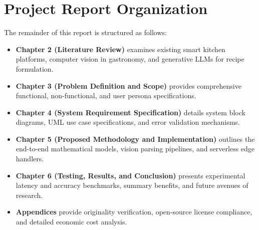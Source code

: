 \section{Project Report Organization}
The remainder of this report is structured as follows:
\begin{itemize}
    \item \textbf{Chapter 2 (Literature Review)} examines existing smart kitchen platforms, computer vision in gastronomy, and generative LLMs for recipe formulation.
    \item \textbf{Chapter 3 (Problem Definition and Scope)} provides comprehensive functional, non-functional, and user persona specifications.
    \item \textbf{Chapter 4 (System Requirement Specification)} details system block diagrams, UML use case specifications, and error validation mechanisms.
    \item \textbf{Chapter 5 (Proposed Methodology and Implementation)} outlines the end-to-end mathematical models, vision parsing pipelines, and serverless edge handlers.
    \item \textbf{Chapter 6 (Testing, Results, and Conclusion)} presents experimental latency and accuracy benchmarks, summary benefits, and future avenues of research.
    \item \textbf{Appendices} provide originality verification, open-source license compliance, and detailed economic cost analysis.
\end{itemize}
